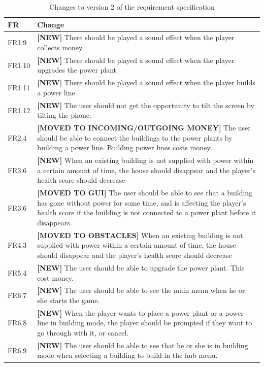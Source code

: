 	\begin{table}[H]
	\begin{tabular}{| p{1.5cm} | p{12cm} |}
		\hline
		\rowcolor{lightgray}
		{\bf FR} & {\bf Change} \\ \hline
		FR1.9 & {\bf \color{green} [NEW]} There should be played a sound effect when 
		the player collects money \\ \hline
		FR1.10 & {\bf \color{green} [NEW]} There should be played a sound effect when 
		the player upgrades the power plant \\ \hline
		FR1.11 & {\bf \color{green} [NEW]} There should be played a sound effect when 
		the player builds a power line\\ \hline
		FR1.12 & {\bf \color{green} [NEW]} The user should not get the opportunity to 
		tilt the screen by tilting the phone. \\ \hline
		FR2.4 & {\bf \color{orange} [MOVED TO INCOMING/OUTGOING MONEY]} The user should 
		be able to connect the buildings to the power plants by building a power line. 
		Building power lines costs money. \\ \hline
		FR3.6 & {\bf \color{green} [NEW]} When an existing building is not supplied 
		with power within a certain amount of time, the house should disappear and the player's 
		health score should decrease \\ \hline
		FR3.6 & {\bf \color{orange} [MOVED TO GUI]} The user should be able to see 
		that a building has gone without power for some time, and is affecting the 
		player's health score if the building is not connected to a power plant before it 
		disappears. \\ \hline
		FR4.3 & {\bf \color{orange} [MOVED TO OBSTACLES]} When an existing building 
		is not supplied with power within a certain amount of time, the house should 
		disappear and the player's health score should decrease \\ \hline
		FR5.4 & {\bf \color{green} [NEW]} The user should be able to upgrade the power plant. 
		This cost money. \\ \hline
		FR6.7 & {\bf \color{green} [NEW]} The user should be able to see the main 
		menu when he or she starts the game. \\ \hline
		FR6.8 & {\bf \color{green} [NEW]} When the player wants to place a power plant 
		or a power line in building mode, the player should be prompted if they want to 
		go through with it, or cancel. \\ \hline
		FR6.9 & {\bf \color{green} [NEW]} The user should be able to see that he or she 
		is in building mode when selecting a building to build in the hub menu. \\ \hline
	\end{tabular}
	\caption{Changes to version 2 of the requirement specification}
	\label{table:reqspec2}
	\end{table}
	
